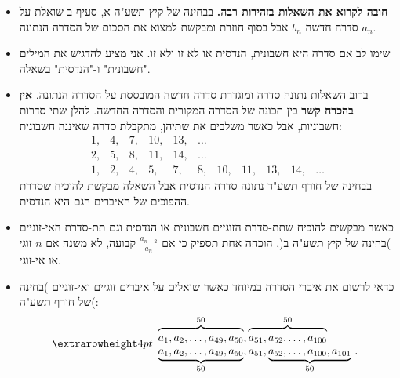 \begin{itemize}


\item
\textbf{חובה לקרוא את השאלות בזהירות רבה.}
בבחינה של קיץ תשע"ה א, סעיף ב שואלת על סדרה חדשה
${b_n}$
אבל בסוף חוזרת ומבקשת למצוא את הסכום של הסדרה הנתונה
${a_n}$.

\item
שימו לב אם סדרה היא חשבונית, הנדסית או לא זו ולא זו. אני מציע להדגיש את המילים "חשבונית" ו-"הנדסית" בשאלה.

\item 
ברוב השאלות נתונה סדרה ומוגדרת סדרה חדשה המובססת על הסדרה הנתונה. 
\textbf{אין בהכרח קשר}
בין תכונה של הסדרה המקורית והסדרה החדשה. להלן שתי סדרות חשבוניות, אבל כאשר משלבים את שתיהן, מתקבלת סדרה שאיננה חשבונית:
\[
\begin{array}{rrrrrrrrrrr}
1,& 4,& 7,& 10,& 13,& \ldots\\
2,& 5,& 8,& 11,& 14, &\ldots\\
1,& 2,& 4,& 5,& 7,& 8,& 10,& 11,& 13,& 14, &\ldots
\end{array}
\]
בבחינה של חורף תשע"ד נתונה סדרה הנדסית אבל השאלה מבקשת להוכיח שסדרת ההפוכים של האיברים הגם היא הנדסית.

\item
כאשר מבקשים להוכיח שתת-סדרת הזוגיים חשבונית או הנדסית וגם תת-סדרת האי-זוגיים )בחינה של קיץ תשע"ה ב(, הוכחה אחת תספיק כי אם 
$\displaystyle \frac{a_{n+2}}{a_n}$
קבועה, לא משנה אם 
$n$
זוגי או אי-זוגי.


\item
כדאי לרשום את איברי הסדרה במיוחד כאשר שואלים על איברים זוגיים ואי-זוגיים )בחינה של חורף תשע"ה(:
\[
\setlength{\extrarowheight}{4pt}
\begin{array}{l}
\overbrace{\rule{0pt}{8pt}a_1, a_2, \ldots, a_{49}, a_{50}}^{50}, \overbrace{\rule{0pt}{8pt}a_{51}, a_{52},\ldots, a_{100}}^{50}\\
\underbrace{\rule{0pt}{8pt}a_1, a_2, \ldots, a_{49}, a_{50}}_{50}, a_{51}, \underbrace{\rule{0pt}{8pt}a_{52}, \ldots, a_{100}, a_{101}}_{50}\,.
\end{array}
\]
\vspace{-4ex}


\end{itemize}
